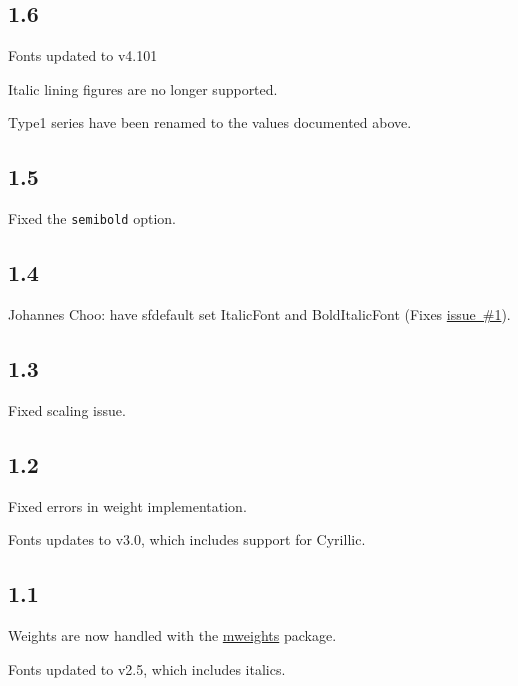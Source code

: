 \documentclass[10pt,a4paper,english]{article}
\begin{document}
\begin{multicols}{2}
\subsection*{1.6}
\begin{itemize*}
\item Fonts updated to v4.101
\item Italic lining figures are no longer supported.
\item Type1 series have been renamed to the values documented above.
\end{itemize*}

\subsection*{1.5}
\begin{itemize*}
\item Fixed the \texttt{semibold} option.
\end{itemize*}

\subsection*{1.4}
\begin{itemize*}
	\item Johannes Choo: have sfdefault set ItalicFont and BoldItalicFont (Fixes \href{https://github.com/silkeh/latex-raleway/issues/1}{issue~\#1}).
\end{itemize*}

\subsection*{1.3}
\begin{itemize*}
	\item Fixed scaling issue.
\end{itemize*}

\subsection*{1.2}
\begin{itemize*}
	\item Fixed errors in weight implementation.
	\item Fonts updates to v3.0, which includes support for Cyrillic.
\end{itemize*}

\subsection*{1.1}
\begin{itemize*}
	\item Weights are now handled with the \href{http://www.ctan.org/pkg/mweights}{mweights} package.
	\item Fonts updated to v2.5, which includes italics.
\end{itemize*}


\end{multicols}
\end{document}
